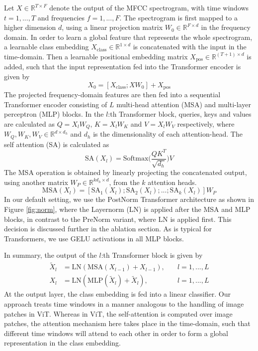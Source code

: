 \documentclass[a4paper]{article}
\begin{document}
Let $X \in \mathbb{R}^{T \times F}$ denote the output of the MFCC spectrogram, with time windows $t = 1,..., T$ and frequencies $f = 1, ..., F$. The spectrogram is first mapped to a higher dimension $d$, using a linear projection matrix $W_0 \in \mathbb{R}^{F \times d}$ in the frequency domain. In order to learn a global feature that represents the whole spectrogram, a learnable class embedding $X_{\text{class}} \in \mathbb{R}^{1 \times d}$ is concatenated with the input in the time-domain. Then a learnable positional embedding matrix $X_{\text{pos}} \in \mathbb{R}^{(T+1) \times d}$ is added, such that the input representation fed into the Transformer encoder is given by
\begin{equation}
X_0 = [ X_{\text{class}};XW_0 ] + X_{\text{pos}}
\end{equation}
The projected frequency-domain features are then fed into a sequential Transformer encoder consisting of $L$ multi-head attention (MSA) and multi-layer perceptron (MLP) blocks. In the $l$:th Transformer block, queries, keys and values are calculated as $Q = X_lW_Q$, $K = X_lW_K$ and $V = X_lW_V$ respectively, where $W_Q, W_K, W_V \in \mathbb{R}^{d \times d_h}$ and $d_h$ is the dimensionality of each attention-head. The self attention (SA) is calculated as
\begin{equation}
\text{SA}(X_l) = \text{Softmax}\Big(\frac{QK^T}{\sqrt{d_h}}\Big)V
\end{equation}
The MSA operation is obtained by linearly projecting the concatenated output, using another matrix $W_P \in \mathbb{R}^{k d_h \times d}$, from the $k$ attention heads.
\begin{equation}
\text{MSA}(X_l) = [\text{SA}_1(X_l); \text{SA}_2(X_l); ...; \text{SA}_k(X_l)] W_P
\end{equation}
In our default setting, we use the PostNorm \cite{vaswani2017attention} Transformer architecture as shown in Figure \ref{fig:norm}, where the Layernorm (LN) \cite{ba2016layer} is applied after the MSA and MLP blocks, in contrast to the PreNorm \cite{he2016deep} variant, where LN is applied first. This decision is discussed further in the ablation section. As is typical for Transformers, we use GELU \cite{hendrycks2016gaussian} activations in all MLP blocks.

In summary, the output of the $l$:th Transformer block is given by
\begin{align}
\tilde{X}_l &= \text{LN}(\text{MSA}(X_{l-1}) + X_{l-1}), \quad &l = 1,...,L \\
X_l &= \text{LN}(\text{MLP}(\tilde{X}_l) + \tilde{X}_l), \quad &l = 1, ..., L
\end{align}
At the output layer, the class embedding is fed into a linear classifier. Our approach treats time windows in a manner analogous to the handling of image patches in ViT. Whereas in ViT, the self-attention is computed over image patches, the attention mechanism here takes place in the time-domain, such that different time windows will attend to each other in order to form a global representation in the class embedding.
\end{document}
